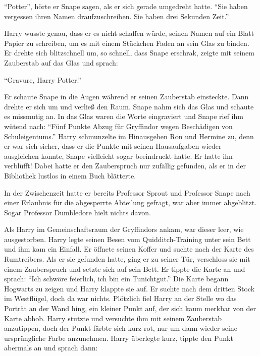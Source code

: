 \enquote{Potter}, hörte er Snape sagen, als er sich gerade umgedreht hatte. \enquote{Sie haben vergessen ihren Namen draufzuschreiben. Sie haben drei Sekunden Zeit.}

Harry wusste genau, dass er es nicht schaffen würde, seinen Namen auf ein Blatt Papier zu schreiben, um es mit einem Stückchen Faden an sein Glas zu binden. Er drehte sich blitzschnell um, so schnell, dass Snape erschrak, zeigte mit seinem Zauberstab auf das Glas und sprach:

\enquote{Gravure, Harry Potter.}

Er schaute Snape in die Augen während er seinen Zauberstab einsteckte. Dann drehte er sich um und verließ den Raum. Snape nahm sich das Glas und schaute es missmutig an. In das Glas waren die Worte  eingraviert und Snape rief ihm wütend nach: \enquote{Fünf Punkte Abzug für Gryffindor wegen Beschädigen von Schuleigentums.} Harry schmunzelte im Hinausgehen Ron und Hermine zu, denn er war sich sicher, dass er die Punkte mit seinen Hausaufgaben wieder ausgleichen konnte, Snape vielleicht sogar beeindruckt hatte. Er hatte ihn verblüfft! Dabei hatte er den Zauberspruch nur zufällig gefunden, als er in der Bibliothek lustlos in einem Buch blätterte.

In der Zwischenzeit hatte er bereits Professor Sprout und Professor Snape nach einer Erlaubnis für die abgesperrte Abteilung gefragt, war aber immer abgeblitzt. Sogar Professor Dumbledore hielt nichts davon.

\trenn

Als Harry im Gemeinschaftsraum der Gryffindors ankam, war dieser leer, wie ausgestorben. Harry legte seinen Besen vom Quidditch-Training unter sein Bett und ihm kam ein Einfall. Er öffnete seinen Koffer und suchte nach der Karte des Rumtreibers. Als er sie gefunden hatte, ging er zu seiner Tür, verschloss sie mit einem Zauberspruch und setzte sich auf sein Bett. Er tippte die Karte an und sprach: \enquote{Ich schwöre feierlich, ich bin ein Tunichtgut.} Die Karte begann Hogwarts zu zeigen und Harry klappte sie auf. Er suchte nach dem dritten Stock im Westflügel, doch da war nichts. Plötzlich fiel Harry an der Stelle wo das Porträt an der Wand hing, ein kleiner Punkt auf, der sich kaum merkbar von der Karte abhob. Harry stutzte und versuchte ihm mit seinem Zauberstab anzutippen, doch der Punkt färbte sich kurz rot, nur um dann wieder seine ursprüngliche Farbe anzunehmen. Harry überlegte kurz, tippte den Punkt abermals an und sprach dann: 

